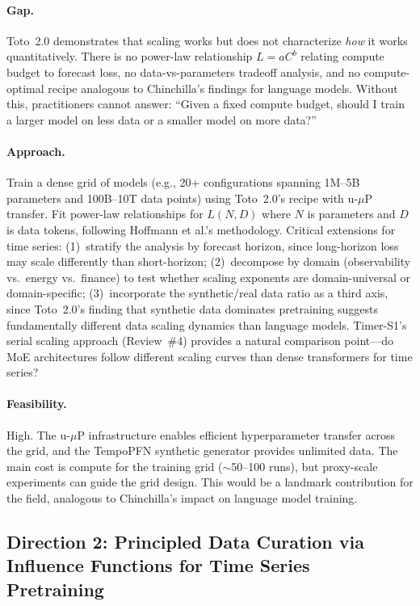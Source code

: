 \documentclass[11pt,a4paper]{article}
\begin{document}
\paragraph{Gap.}
Toto~2.0 demonstrates that scaling works but does not characterize \emph{how} it works quantitatively. There is no power-law relationship $L = aC^b$ relating compute budget to forecast loss, no data-vs-parameters tradeoff analysis, and no compute-optimal recipe analogous to Chinchilla's findings for language models. Without this, practitioners cannot answer: ``Given a fixed compute budget, should I train a larger model on less data or a smaller model on more data?''

\paragraph{Approach.}
Train a dense grid of models (e.g., 20+ configurations spanning 1M--5B parameters and 100B--10T data points) using Toto~2.0's recipe with u-$\mu$P transfer. Fit power-law relationships for $L(N, D)$ where $N$ is parameters and $D$ is data tokens, following Hoffmann et al.'s methodology. Critical extensions for time series: (1)~stratify the analysis by forecast horizon, since long-horizon loss may scale differently than short-horizon; (2)~decompose by domain (observability vs.\ energy vs.\ finance) to test whether scaling exponents are domain-universal or domain-specific; (3)~incorporate the synthetic/real data ratio as a third axis, since Toto~2.0's finding that synthetic data dominates pretraining suggests fundamentally different data scaling dynamics than language models. Timer-S1's serial scaling approach (Review~\#4) provides a natural comparison point---do MoE architectures follow different scaling curves than dense transformers for time series?

\paragraph{Feasibility.}
High. The u-$\mu$P infrastructure enables efficient hyperparameter transfer across the grid, and the TempoPFN synthetic generator provides unlimited data. The main cost is compute for the training grid ($\sim$50--100 runs), but proxy-scale experiments can guide the grid design. This would be a landmark contribution for the field, analogous to Chinchilla's impact on language model training.

\subsection*{Direction 2: Principled Data Curation via Influence Functions for Time Series Pretraining}
\end{document}

